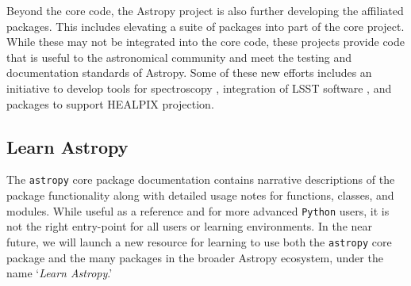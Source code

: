 \documentclass[modern]{aastex61}
\newcommand{\package}[1]{\texttt{#1}\xspace}
\newcommand{\python}{\package{Python}}
\newcommand{\astropy}{Astropy\xspace}
\newcommand{\astropypkg}{\package{astropy}}
\begin{document}
Beyond the core code, the \astropy project is also further developing the affiliated packages.  This includes elevating a suite of packages into part of the core project.    While these may not be integrated into the core code, these projects provide code that is useful to the astronomical community and meet the testing and documentation standards of \astropy.   Some of these new efforts includes an initiative to develop tools for spectroscopy , integration of LSST software , and packages to support HEALPIX projection.


\subsection{Learn Astropy}

The \astropypkg core package documentation contains narrative descriptions of
the package functionality along with detailed usage notes for functions,
classes, and modules.
While useful as a reference and for more advanced \python users, it is not the
right entry-point for all users or learning environments.
In the near future, we will launch a new resource for learning to use both the
\astropypkg core package and the many packages in the broader \astropy
ecosystem, under the name `\emph{Learn Astropy}.'
\end{document}
